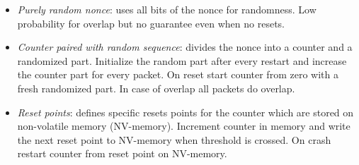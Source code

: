 \begin{itemize}
	\item \textit{Purely random nonce}: uses all bits of the nonce for randomness. Low 
	probability for overlap but no guarantee even when no resets.
	\item \textit{Counter paired with random sequence}: divides the nonce into a counter 
	and a randomized part. Initialize the random part after every restart and increase 
	the counter part for every packet. On reset start counter from zero with a fresh 
	randomized part. In case of overlap all packets do overlap.
	\item \textit{Reset points}: defines specific resets points for the counter which are
	stored on non-volatile memory (NV-memory). Increment counter in memory and write the 
	next reset point to NV-memory when threshold is crossed. On crash restart counter from 
	reset point on NV-memory.
\end{itemize}






